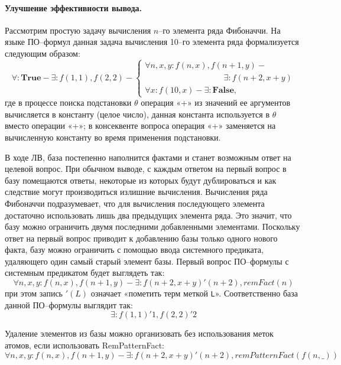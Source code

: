 \paragraph{Улучшение эффективности вывода.} Рассмотрим простую задачу вычисления $n$--го элемента ряда Фибоначчи. На языке ПО--формул данная задача вычисления 10--го элемента ряда формализуется следующим образом:
\begin{equation*}
	\forall\colon\boldsymbol{True} - \exists\colon f(1,1), f(2,2) -
	\left\lbrace
	\begin{array}{l}
		\forall n,x,y\colon f(n,x),f(n+1,y) - \\
                    \hspace{4cm}\exists\colon f(n+2,x+y) \\
		\forall x\colon f(10,x) - \exists\colon \boldsymbol{False},
	\end{array}\right.
\end{equation*}
где в процессе поиска подстановки $\theta$ операция «+» из значений ее аргументов вычисляется в константу (целое число), данная константа используется в $\theta$ вместо операции «+»; в консеквенте вопроса операция «+» заменяется на вычисленную константу во время применения подстановки.

В ходе ЛВ, база постепенно наполнится фактами и станет возможным ответ на целевой вопрос. При обычном выводе, с каждым ответом на первый вопрос в базу помещаются ответы, некоторые из которых будут дублироваться и как следствие могут производиться излишние вычисления. Вычисления ряда Фибоначчи подразумевает, что для вычисления последующего элемента достаточно использовать лишь два предыдущих элемента ряда. Это значит, что базу можно ограничить двумя последними добавленными элементами. Поскольку ответ на первый вопрос приводит к добавлению базы только одного нового факта, базу можно ограничить с помощью ввода системного предиката, удаляющего один самый старый элемент базы. Первый вопрос ПО--формулы с системным предикатом будет выглядеть так:
\begin{equation*}
	\forall n,x,y\colon f(n,x),f(n+1,y) - \exists\colon f(n+2,x+y)'(n+2), remFact(n)
\end{equation*}
при этом запись $'(L)$ означает «пометить терм меткой \texttt{L}». Соответственно база данной ПО--формулы выглядит так:
\begin{equation*}
\exists\colon f(1,1)'1, f(2,2)'2
\end{equation*}

Удаление элементов из базы можно организовать без использования меток атомов, если использовать RemPatternFact:
\begin{equation*}
	\forall n,x,y\colon f(n,x),f(n+1,y) - \exists\colon f(n+2,x+y)'(n+2), remPatternFact(f(n,\_))
\end{equation*}

